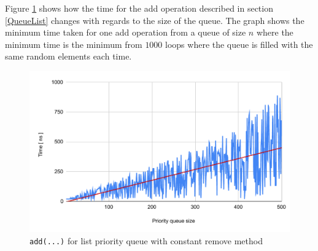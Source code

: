 \documentclass[a4paper,11pt]{article}
\begin{document}
Figure \ref{fig:QueueListAdd} shows how the time for the add operation described in section \ref{QueueList} changes
with regards to the size of the queue. The graph shows the minimum time taken for one add operation from a queue
of size $n$ where the minimum time is the minimum from $1000$ loops where the queue is filled with the same random 
elements each time.
\begin{figure}[h!]
    \centering
        \includegraphics[width=\textwidth]{QueueListAdd.pdf}
        \caption{{\tt add(...)} for list priority queue with constant remove method}
        \label{fig:QueueListAdd}
    
\end{figure}
\end{document}
